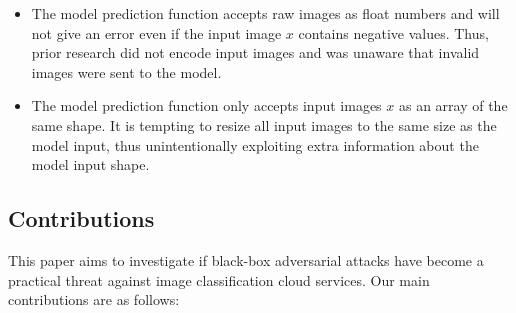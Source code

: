\begin{itemize}
    \item The model prediction function accepts raw images as float numbers and will not give an error even if the input image $x$ contains negative values. Thus, prior research did not encode input images and was unaware that invalid images were sent to the model.
    \item The model prediction function only accepts input images $x$ as an array of the same shape. It is tempting to resize all input images to the same size as the model input, thus unintentionally exploiting extra information about the model input shape.
\end{itemize}




\subsection{Contributions}

This paper aims to investigate if black-box adversarial attacks have become a practical threat against image classification cloud services. Our main contributions are as follows: 

